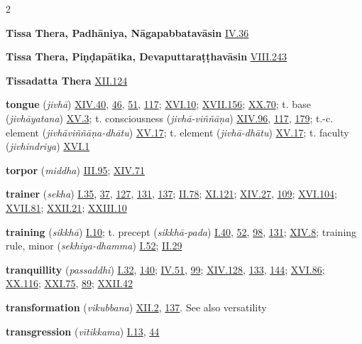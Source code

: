 \begin{multicols}{2}
\begin{vismHanging}
\par\textbf{Tissa Thera, Padhāniya, Nāgapabbatavāsin} \hyperlink{IV.36}{IV.36}{}
\par\textbf{Tissa Thera, Piṇḍapātika, Devaputtaraṭṭhavāsin} \hyperlink{VIII.243}{VIII.243}{}
\par\textbf{Tissadatta Thera} \hyperlink{XII.124}{XII.124}{}
\par\textbf{tongue} (\emph{jivhā}) \hyperlink{XIV.40}{XIV.40}{}, \hyperlink{XIV.46}{46}{}, \hyperlink{XIV.51}{51}{}, \hyperlink{XIV.117}{117}{}; \hyperlink{XVI.10}{XVI.10}{}; \hyperlink{XVII.156}{XVII.156}{}; \hyperlink{XX.70}{XX.70}{}; t. base (\emph{jivhāyatana}) \hyperlink{XV.3}{XV.3}{}; t. consciousness (\emph{jivhā-viññāṇa}) \hyperlink{XIV.96}{XIV.96}{}, \hyperlink{XIV.117}{117}{}, \hyperlink{XIV.179}{179}{}; t.-c. element (\emph{jivhāviññāṇa-dhātu}) \hyperlink{XV.17}{XV.17}{}; t. element (\emph{jivhā-dhātu}) \hyperlink{XV.17}{XV.17}{}; t. faculty (\emph{jivhindriya}) \hyperlink{XVI.1}{XVI.1}{}
\par\textbf{torpor} (\emph{middha}) \hyperlink{III.95}{III.95}{}; \hyperlink{XIV.71}{XIV.71}{}
\par\textbf{trainer} (\emph{sekha}) \hyperlink{I.35}{I.35}{}, \hyperlink{I.37}{37}{}, \hyperlink{I.127}{127}{}, \hyperlink{I.131}{131}{}, \hyperlink{I.137}{137}{}; \hyperlink{II.78}{II.78}{}; \hyperlink{XI.121}{XI.121}{}; \hyperlink{XIV.27}{XIV.27}{}, \hyperlink{XIV.109}{109}{}; \hyperlink{XVI.104}{XVI.104}{}; \hyperlink{XVII.81}{XVII.81}{}; \hyperlink{XXII.21}{XXII.21}{}; \hyperlink{XXIII.10}{XXIII.10}{}
\par\textbf{training} (\emph{sikkhā}) \hyperlink{I.10}{I.10}{}; t. precept (\emph{sikkhā-pada}) \hyperlink{I.40}{I.40}{}, \hyperlink{I.52}{52}{}, \hyperlink{I.98}{98}{}, \hyperlink{I.131}{131}{}; \hyperlink{XIV.8}{XIV.8}{}; training rule, minor (\emph{sekhiya-dhamma}) \hyperlink{I.52}{I.52}{}; \hyperlink{II.29}{II.29}{}
\par\textbf{tranquillity} (\emph{passaddhi}) \hyperlink{I.32}{I.32}{}, \hyperlink{I.140}{140}{}; \hyperlink{IV.51}{IV.51}{}, \hyperlink{IV.99}{99}{}; \hyperlink{XIV.128}{XIV.128}{}, \hyperlink{XIV.133}{133}{}, \hyperlink{XIV.144}{144}{}; \hyperlink{XVI.86}{XVI.86}{}; \hyperlink{XX.116}{XX.116}{}; \hyperlink{XXI.75}{XXI.75}{}, \hyperlink{XXI.89}{89}{}; \hyperlink{XXII.42}{XXII.42}{}
\par\textbf{transformation} (\emph{vikubbana}) \hyperlink{XII.2}{XII.2}{}, \hyperlink{XII.137}{137}{}. See also versatility 
\par\textbf{transgression} (\emph{vītikkama}) \hyperlink{I.13}{I.13}{}, \hyperlink{I.44}{44}{}

\end{vismHanging}
\end{multicols}
